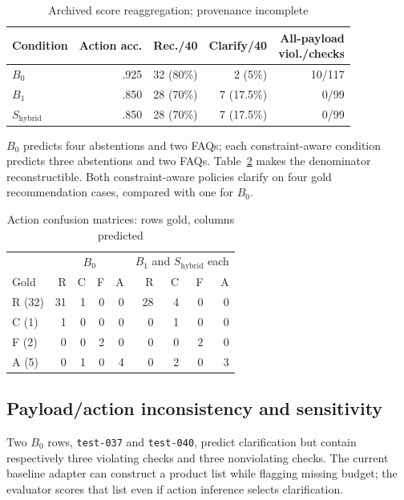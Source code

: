 \documentclass[conference,a4paper]{IEEEtran}
\newcommand{\sys}{S_{\mathrm{hybrid}}}
\newcommand{\code}[1]{\texttt{#1}}
\begin{document}
\begin{table}[t]
\caption{Archived score reaggregation; provenance incomplete}
\label{tab:results}
\centering\footnotesize
\begin{tabular}{@{}lrrrr@{}}
\toprule
Condition & Action acc. & Rec./40 & Clarify/40 & \shortstack{All-payload\\viol./checks}\\
\midrule
$B_0$ & .925 & 32 (80\%) & 2 (5\%) & 10/117\\
$B_1$ & .850 & 28 (70\%) & 7 (17.5\%) & 0/99\\
$\sys$ & .850 & 28 (70\%) & 7 (17.5\%) & 0/99\\
\bottomrule
\end{tabular}
\end{table}

$B_0$ predicts four abstentions and two FAQs; each constraint-aware condition predicts three abstentions and two FAQs. Table~\ref{tab:confusion} makes the denominator reconstructible. Both constraint-aware policies clarify on four gold recommendation cases, compared with one for $B_0$.

\begin{table}[t]
\caption{Action confusion matrices: rows gold, columns predicted}
\label{tab:confusion}
\centering\footnotesize
\begin{tabular}{@{}lrrrr@{\qquad}rrrr@{}}
\toprule
&\multicolumn{4}{c}{$B_0$}&\multicolumn{4}{c}{$B_1$ and $\sys$ each}\\
Gold & R&C&F&A & R&C&F&A\\
\midrule
R (32)&31&1&0&0&28&4&0&0\\
C (1)&1&0&0&0&0&1&0&0\\
F (2)&0&0&2&0&0&0&2&0\\
A (5)&0&1&0&4&0&2&0&3\\
\bottomrule
\end{tabular}
\end{table}

\subsection{Payload/action inconsistency and sensitivity}
Two $B_0$ rows, \code{test-037} and \code{test-040}, predict clarification but contain respectively three violating checks and three nonviolating checks. The current baseline adapter can construct a product list while flagging missing budget; the evaluator scores that list even if action inference selects clarification.
\end{document}
